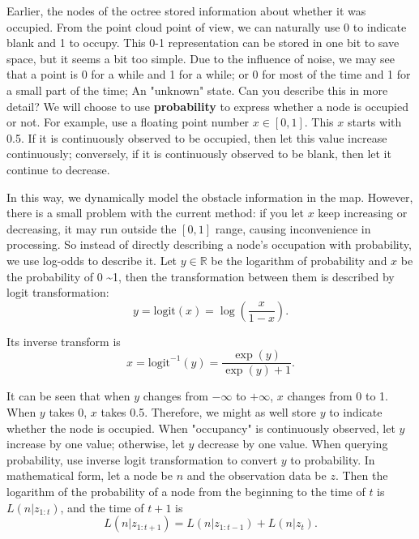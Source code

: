 \newpage
Earlier, the nodes of the octree stored information about whether it was occupied. From the point cloud point of view, we can naturally use 0 to indicate blank and 1 to occupy. This 0-1 representation can be stored in one bit to save space, but it seems a bit too simple. Due to the influence of noise, we may see that a point is 0 for a while and 1 for a while; or 0 for most of the time and 1 for a small part of the time; An "unknown" state. Can you describe this in more detail? We will choose to use \textbf{probability} to express whether a node is occupied or not. For example, use a floating point number $ x \in[0,1] $. This $ x $ starts with 0.5. If it is continuously observed to be occupied, then let this value increase continuously; conversely, if it is continuously observed to be blank, then let it continue to decrease.

In this way, we dynamically model the obstacle information in the map. However, there is a small problem with the current method: if you let $ x $ keep increasing or decreasing, it may run outside the $[0,1] $ range, causing inconvenience in processing. So instead of directly describing a node's occupation with probability, we use log-odds to describe it. Let $ y \in \mathbb{R} $ be the logarithm of probability and $ x $ be the probability of 0 \textasciitilde1, then the transformation between them is described by logit transformation:
\begin{equation}
y=\mathrm{logit}(x)=\log \left( \frac{x}{1-x} \right).
\end{equation}

Its inverse transform is
\begin{equation}
x=\mathrm{logit}^{-1}(y)=\frac{\exp(y)}{\exp(y)+1}.
\end{equation}

\enlargethispage{4pt}
It can be seen that when $ y $ changes from $-\infty $ to $ + \infty $, $ x $ changes from 0 to 1. When $ y $ takes 0, $ x $ takes 0.5. Therefore, we might as well store $ y $ to indicate whether the node is occupied. When "occupancy" is continuously observed, let $ y $ increase by one value; otherwise, let $ y $ decrease by one value. When querying probability, use inverse logit transformation to convert $ y $ to probability. In mathematical form, let a node be $ n $ and the observation data be $ z $. Then the logarithm of the probability of a node from the beginning to the time of $ t $ is $ L (n | z_{1: t}) $, and the time of $ t + 1 $ is
\clearpage
\begin{equation}
L(n|z_{1:t+1})=L(n|z_{1:t-1}) + L(n|z_{t}).
\end{equation}


